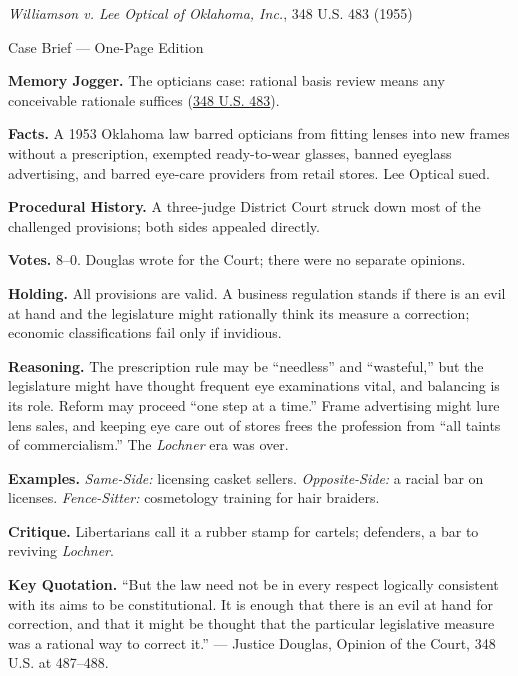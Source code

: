 \documentclass[12pt]{article}
\begin{document}
\begin{center}
{\Large \textit{Williamson v. Lee Optical of Oklahoma, Inc.}, 348 U.S. 483 (1955)\par}
\vspace{0.3em}
{\normalsize Case Brief --- One-Page Edition\par}
\end{center}

\textbf{Memory Jogger.} The opticians case: rational basis review means any conceivable rationale suffices (\href{https://www.courtlistener.com/opinion/105285/williamson-v-lee-optical-of-oklahoma-inc/}{348 U.S. 483}).

\textbf{Facts.} A 1953 Oklahoma law barred opticians from fitting lenses into new frames without a prescription, exempted ready-to-wear glasses, banned eyeglass advertising, and barred eye-care providers from retail stores. Lee Optical sued.

\textbf{Procedural History.} A three-judge District Court struck down most of the challenged provisions; both sides appealed directly.

\textbf{Votes.} 8--0. Douglas wrote for the Court; there were no separate opinions.

\textbf{Holding.} All provisions are valid. A business regulation stands if there is an evil at hand and the legislature might rationally think its measure a correction; economic classifications fail only if invidious.

\textbf{Reasoning.} The prescription rule may be ``needless'' and ``wasteful,'' but the legislature might have thought frequent eye examinations vital, and balancing is its role. Reform may proceed ``one step at a time.'' Frame advertising might lure lens sales, and keeping eye care out of stores frees the profession from ``all taints of commercialism.'' The \textit{Lochner} era was over.

\textbf{Examples.} \emph{Same-Side:} licensing casket sellers. \emph{Opposite-Side:} a racial bar on licenses. \emph{Fence-Sitter:} cosmetology training for hair braiders.

\textbf{Critique.} Libertarians call it a rubber stamp for cartels; defenders, a bar to reviving \textit{Lochner}.

\textbf{Key Quotation.} ``But the law need not be in every respect logically consistent with its aims to be constitutional. It is enough that there is an evil at hand for correction, and that it might be thought that the particular legislative measure was a rational way to correct it.'' --- Justice Douglas, Opinion of the Court, 348 U.S. at 487--488.
\end{document}
